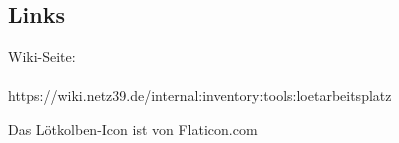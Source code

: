 \documentclass[a5paper]{article}
\begin{document}
		
	\noindent\dotfill
	\subsection*{Links}
	\begin{center}
		\begin{minipage}{0.6\textwidth}
			\centering
			Wiki-Seite:\\[0.5em]
			\\[0.5em]
			https://wiki.netz39.de/internal:inventory:tools:loetarbeitsplatz
		\end{minipage}
	\end{center}
	
	\vspace{1em}
	
	\noindent{}
	\vfill
	\begin{center}
		\color{darkgray}
		Das Lötkolben-Icon ist von Flaticon.com
	\end{center}
	
\end{document}
